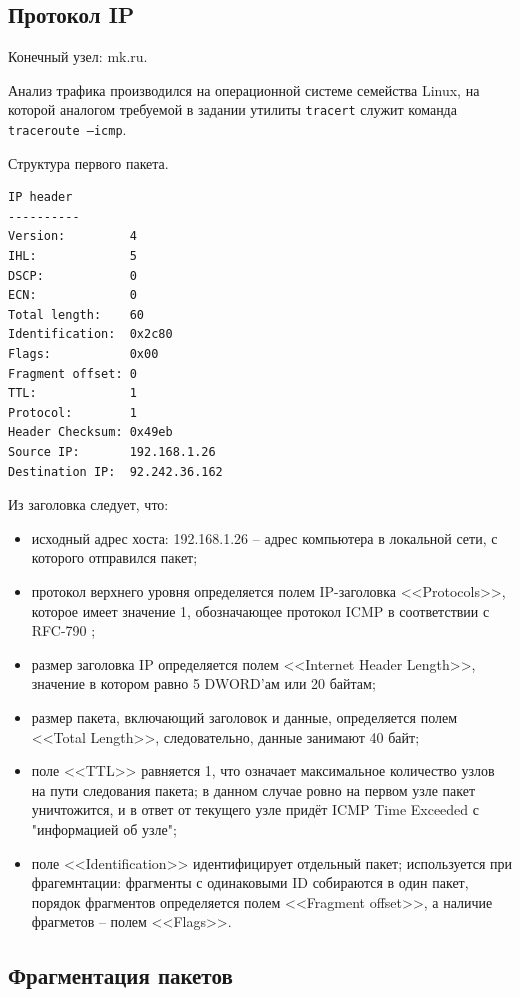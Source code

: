 \documentclass[12pt, a4paper] {ncc}
\begin{document}
    \subsection*{Протокол IP}
        Конечный узел: mk.ru.

        Анализ трафика производился на операционной системе семейства Linux, на которой
        аналогом требуемой в задании утилиты \texttt{tracert} служит команда
        \texttt{traceroute --icmp}.

        Структура первого пакета.
    \begin{verbatim}
IP header
----------
Version:         4
IHL:             5
DSCP:            0
ECN:             0
Total length:    60
Identification:  0x2c80
Flags:           0x00
Fragment offset: 0
TTL:             1
Protocol:        1
Header Checksum: 0x49eb
Source IP:       192.168.1.26
Destination IP:  92.242.36.162
    \end{verbatim}
    Из заголовка следует, что:
    \begin{itemize}
        \item исходный адрес хоста: 192.168.1.26 -- адрес компьютера в локальной сети, с которого
              отправился пакет;
        \item протокол верхнего уровня определяется полем IP-заголовка <<Protocols>>, которое имеет
              значение 1, обозначающее протокол ICMP в соответствии с RFC-790 ;
        \item размер заголовка IP определяется полем <<Internet Header Length>>, значение в котором
              равно 5 DWORD'ам или 20 байтам; 
        \item размер пакета, включающий заголовок и данные, определяется
              полем <<Total Length>>, следовательно, данные занимают 40 байт;
        \item поле <<TTL>> равняется 1, что означает максимальное количество узлов на пути следования
              пакета; в данном случае ровно на первом узле пакет уничтожится, и в
              ответ от текущего узле придёт ICMP Time Exceeded с "информацией об узле";
        \item поле <<Identification>> идентифицирует отдельный пакет; используется 
              при фрагемнтации: фрагменты с одинаковыми ID собираются в один пакет, 
              порядок фрагментов определяется полем <<Fragment offset>>, а
              наличие фрагметов -- полем <<Flags>>.
    \end{itemize}
    
    \subsection*{Фрагментация пакетов}
\end{document}
